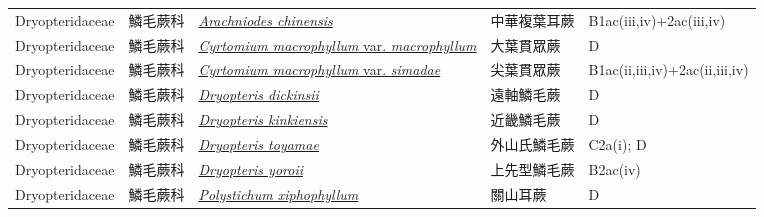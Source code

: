 {\begin{longtable}{L{2.5cm}L{2cm}L{5cm}L{2.5cm}L{3cm}}
    Dryopteridaceae & 鱗毛蕨科 & \href{http://www.theplantlist.org/tpl1.1/search?q=Arachniodes+chinensis}{\textit{Arachniodes chinensis} } & 中華複葉耳蕨 & B1ac(iii,iv)+2ac(iii,iv)    \\
    Dryopteridaceae & 鱗毛蕨科 & \href{http://www.theplantlist.org/tpl1.1/search?q=Cyrtomium+macrophyllum+var.+macrophyllum}{\textit{Cyrtomium macrophyllum} var. \textit{macrophyllum} } & 大葉貫眾蕨 & D    \\
    Dryopteridaceae & 鱗毛蕨科 & \href{http://www.theplantlist.org/tpl1.1/search?q=Cyrtomium+macrophyllum+var.+simadae}{\textit{Cyrtomium macrophyllum} var. \textit{simadae} } & 尖葉貫眾蕨 & B1ac(ii,iii,iv)+2ac(ii,iii,iv)    \\
    Dryopteridaceae & 鱗毛蕨科 & \href{http://www.theplantlist.org/tpl1.1/search?q=Dryopteris+dickinsii}{\textit{Dryopteris dickinsii} } & 遠軸鱗毛蕨 & D    \\
    Dryopteridaceae & 鱗毛蕨科 & \href{http://www.theplantlist.org/tpl1.1/search?q=Dryopteris+kinkiensis}{\textit{Dryopteris kinkiensis} } & 近畿鱗毛蕨 & D    \\
    Dryopteridaceae & 鱗毛蕨科 & \href{http://www.theplantlist.org/tpl1.1/search?q=Dryopteris+toyamae}{\textit{Dryopteris toyamae} } & 外山氏鱗毛蕨 & C2a(i); D    \\
    Dryopteridaceae & 鱗毛蕨科 & \href{http://www.theplantlist.org/tpl1.1/search?q=Dryopteris+yoroii}{\textit{Dryopteris yoroii} } & 上先型鱗毛蕨 & B2ac(iv)    \\
    Dryopteridaceae & 鱗毛蕨科 & \href{http://www.theplantlist.org/tpl1.1/search?q=Polystichum+xiphophyllum}{\textit{Polystichum xiphophyllum} } & 關山耳蕨 & D    \\

\end{longtable}}

